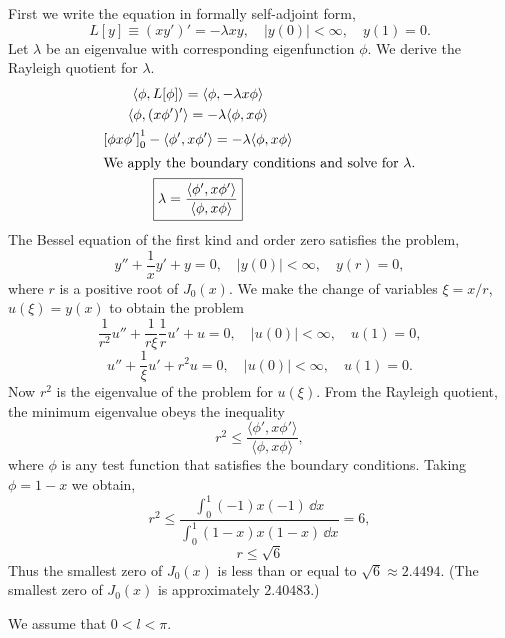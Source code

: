 {%
\begin{Solution}
  \label{solution y''+1xy'+ly=0}
  First we write the equation in formally self-adjoint form,
  \[
  L[y] \equiv 
  (x y')' = - \lambda x y, \quad 
  |y(0)| < \infty, \quad y(1) = 0.
  \]
  Let $\lambda$ be an eigenvalue with corresponding eigenfunction $\phi$.
  We derive the Rayleigh quotient for $\lambda$.
  \begin{gather*}
    \langle \phi, L[\phi] \rangle = \langle \phi, - \lambda x \phi \rangle \\
    \langle \phi, (x \phi')' \rangle = -\lambda \langle \phi, x \phi \rangle \\
    \left[ \phi x \phi' \right]_0^1 - \langle \phi', x \phi' \rangle 
    = -\lambda \langle \phi, x \phi \rangle \\
    \intertext{We apply the boundary conditions and solve for $\lambda$.}
    \boxed{
      \lambda = \frac{ \langle \phi', x \phi' \rangle }{ \langle \phi, x \phi \rangle }
      }
  \end{gather*}
  The Bessel equation of the first kind and order zero satisfies the problem,
  \[
  y'' + \frac{1}{x} y' + y = 0, \quad
  |y(0)| < \infty, \quad y(r) = 0,
  \]
  where $r$ is a positive root of $J_0(x)$.  We make the change of variables
  $\xi = x/r$, $u(\xi) = y(x)$ to obtain the problem
  \[
  \frac{1}{r^2} u'' + \frac{1}{r \xi} \frac{1}{r} u' + u = 0, \quad
  |u(0)| < \infty, \quad u(1) = 0,
  \]
  \[
  u'' + \frac{1}{\xi} u' + r^2 u = 0, \quad
  |u(0)| < \infty, \quad u(1) = 0.
  \]
  Now $r^2$ is the eigenvalue of the problem for $u(\xi)$.  From the Rayleigh
  quotient, the minimum eigenvalue obeys the inequality
  \[
  r^2 \leq \frac{ \langle \phi', x \phi' \rangle }{ \langle \phi, x \phi \rangle },
  \]
  where $\phi$ is any test function that satisfies the boundary 
  conditions.  Taking $\phi = 1-x$ we obtain,
  \[
  r^2 \leq \frac{ \int_0^1 (-1) x (-1) \,\dd x }{ \int_0^1 (1-x)x(1-x)\,\dd x } = 6,
  \]
  \[
  \boxed{
    r \leq \sqrt{6}
    }
  \]
  Thus the smallest zero of $J_0(x)$ is less than or equal to 
  $\sqrt{6} \approx 2.4494$.  (The smallest zero of $J_0(x)$ is approximately
  $2.40483$.)
\end{Solution}












\begin{Solution}
  \label{solution y''+lqy=0}
  We assume that $0 < l < \pi$.


\end{Solution}}
